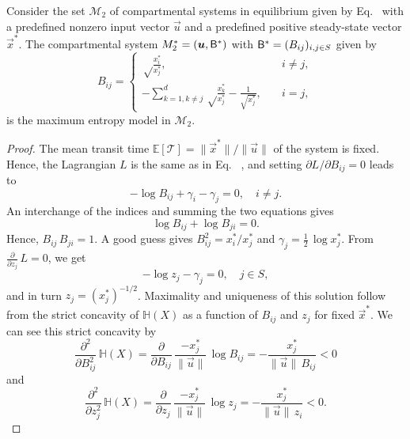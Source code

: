 \documentclass[smallextended]{svjour3}
\makeatletter
\renewcommand*{\eqref}[1]{%
  \hyperref[{#1}]{\textup{\tagform@{\ref*{#1}}}}%
}
\newcommand{\E}{\mathbb{E}}
\newcommand{\TT}{\mathcal{T}}
\renewcommand{\H}{\mathbb{H}}
\newcommand{\suml}{\sum\limits}
\newcommand{\pderiv}[1]{\frac{\partial}{\partial #1}}
\newcommand{\vnorms}[1]{\|#1\|}
\makeatother
\begin{document}
	\begin{proposition}
    \label{proposition:max_ent_example_2}
		Consider the set $\mathcal{M}_2$ of compartmental systems in equilibrium given by Eq.~\eqref{eqn:lin_CS_sys} with a predefined nonzero input vector $\vec{u}$ and a predefined positive steady-state vector $\vec{x}^\ast$.
		The compartmental system $M^\ast_2=(\vec{u},\tens{B}^\ast)$ with $\mathsf{B}^\ast=(B_{ij})_{i,j\in S}$ given by
		\begin{equation*}
			B_{ij} = \begin{cases}
							\sqrt\frac{x_i^\ast}{x_j^\ast},\quad & i\neq j,\\
							-\suml_{k=1,k\neq j}^d \sqrt\frac{x_k^\ast}{x_j^\ast} - \frac{1}{\sqrt{x_j^\ast}}, \quad &i=j,
						\end{cases}
		\end{equation*}
		is the maximum entropy model in $\mathcal{M}_2$.
	\end{proposition}

	\begin{proof}
		The mean transit time $\E\left[\TT\right]=\vnorms{\vec{x}^\ast}/\vnorms{\vec{u}}$ of the system is fixed.
		Hence, the Lagrangian $L$ is the same as in Eq.~\eqref{eqn:Lagrangian}, and setting $\partial L / \partial B_{ij} = 0$ leads  to
		\begin{equation*}
			-\log B_{ij} + \gamma_i-\gamma_j = 0,\quad i\neq j.
		\end{equation*}
		An interchange of the indices and summing the two equations gives
		\begin{equation*}
			\log B_{ij} + \log B_{ji} = 0.
		\end{equation*}
		Hence, $B_{ij}\,B_{ji} = 1$.
		A good guess gives $B_{ij}^2 = x_i^\ast/x_j^\ast$ and $\gamma_j = \frac{1}{2}\,\log x_j^\ast$.
		From $\pderiv{z_j}\,L=0$, we get
		\begin{equation*}
			-\log z_j -\gamma_j = 0,\quad j\in S,
		\end{equation*}
		and in turn $z_j=(x_j^\ast)^{-1/2}$.
		Maximality and uniqueness of this solution follow from the strict concavity of $\H(X)$ as a function of $B_{ij}$ and $z_j$ for fixed $\vec{x}^\ast$.
		We can see this strict concavity by 
		\begin{equation*}
			\frac{\partial^2}{\partial B_{ij}^2}\,\H(X) = \pderiv{B_{ij}}\,\frac{-x_j^\ast}{\vnorms{\vec{u}}}\,\log B_{ij} = -\frac{x_j^\ast}{\vnorms{\vec{u}}\,B_{ij}} < 0
		\end{equation*}
		and
		\begin{equation*}
			\frac{\partial^2}{\partial z_j^2}\,\H(X) = \pderiv{z_j}\,\frac{-x_j^\ast}{\vnorms{\vec{u}}}\,\log z_j = -\frac{x_j^\ast}{\vnorms{\vec{u}}\,z_i} < 0.
		\end{equation*}
	\end{proof}
\end{document}

